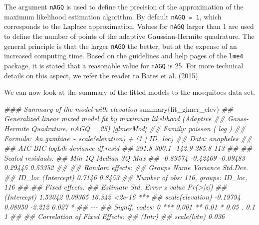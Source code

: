 \documentclass[
  letterpaper,
]{krantz}
\newenvironment{Shaded}{\begin{snugshade}}{\end{snugshade}}
\newcommand{\DocumentationTok}[1]{\textcolor[rgb]{0.37,0.37,0.37}{\textit{#1}}}
\newcommand{\FunctionTok}[1]{\textcolor[rgb]{0.28,0.35,0.67}{#1}}
\newcommand{\NormalTok}[1]{\textcolor[rgb]{0.00,0.23,0.31}{#1}}
\begin{document}
The argument \texttt{nAGQ} is used to define the precision of the
approximation of the maximum likelihood estimation algorithm. By default
\texttt{nAGQ\ =\ 1}, which corresponds to the Laplace approximation.
Values for \texttt{nAGQ} larger than 1 are used to define the number of
points of the adaptive Gaussian-Hermite quadrature. The general
principle is that the larger \texttt{nAGQ} the better, but at the
expense of an increased computing time. Based on the guidelines and help
pages of the \texttt{lme4} package, it is stated that a reasonable value
for \texttt{nAGQ} is 25. For more technical details on this aspect, we
refer the reader to Bates et al. (2015).

We can now look at the summary of the fitted models to the mosquitoes
data-set.

\begin{Shaded}
\begin{Highlighting}[]
\DocumentationTok{\#\#\# Summary of the model with elevation}
\FunctionTok{summary}\NormalTok{(fit\_glmer\_elev)}
\DocumentationTok{\#\# Generalized linear mixed model fit by maximum likelihood (Adaptive}
\DocumentationTok{\#\#   Gauss{-}Hermite Quadrature, nAGQ = 25) [glmerMod]}
\DocumentationTok{\#\#  Family: poisson  ( log )}
\DocumentationTok{\#\# Formula: An.gambiae \textasciitilde{} scale(elevation) + (1 | ID\_loc)}
\DocumentationTok{\#\#    Data: anopheles}
\DocumentationTok{\#\# }
\DocumentationTok{\#\#      AIC      BIC   logLik deviance df.resid }
\DocumentationTok{\#\#    291.8    300.1   {-}142.9    285.8      113 }
\DocumentationTok{\#\# }
\DocumentationTok{\#\# Scaled residuals: }
\DocumentationTok{\#\#      Min       1Q   Median       3Q      Max }
\DocumentationTok{\#\# {-}0.89574 {-}0.42469 {-}0.09483  0.29445  0.53352 }
\DocumentationTok{\#\# }
\DocumentationTok{\#\# Random effects:}
\DocumentationTok{\#\#  Groups Name        Variance Std.Dev.}
\DocumentationTok{\#\#  ID\_loc (Intercept) 0.7146   0.8453  }
\DocumentationTok{\#\# Number of obs: 116, groups:  ID\_loc, 116}
\DocumentationTok{\#\# }
\DocumentationTok{\#\# Fixed effects:}
\DocumentationTok{\#\#                  Estimate Std. Error z value Pr(\textgreater{}|z|)    }
\DocumentationTok{\#\# (Intercept)       1.53042    0.09365  16.342   \textless{}2e{-}16 ***}
\DocumentationTok{\#\# scale(elevation) {-}0.19794    0.08950  {-}2.212    0.027 *  }
\DocumentationTok{\#\# {-}{-}{-}}
\DocumentationTok{\#\# Signif. codes:  0 \textquotesingle{}***\textquotesingle{} 0.001 \textquotesingle{}**\textquotesingle{} 0.01 \textquotesingle{}*\textquotesingle{} 0.05 \textquotesingle{}.\textquotesingle{} 0.1 \textquotesingle{} \textquotesingle{} 1}
\DocumentationTok{\#\# }
\DocumentationTok{\#\# Correlation of Fixed Effects:}
\DocumentationTok{\#\#             (Intr)}
\DocumentationTok{\#\# scale(lvtn) 0.036}


\end{Highlighting}
\end{Shaded}
\end{document}
